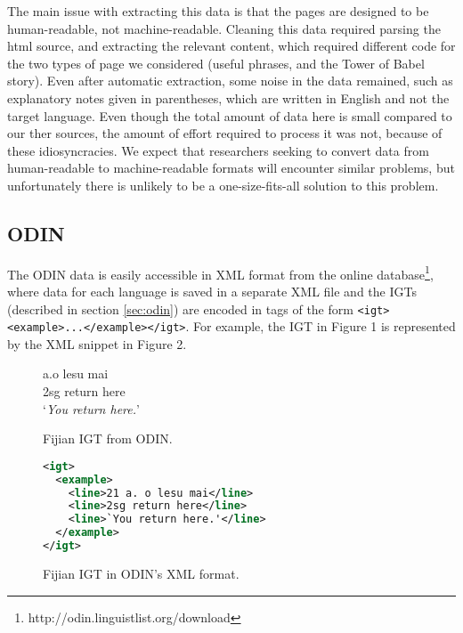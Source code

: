The main issue with extracting this data is that the pages are designed to be human-readable, not machine-readable.  Cleaning this data required parsing the html source, and extracting the relevant content, which required different code for the two types of page we considered (useful phrases, and the Tower of Babel story).  Even after automatic extraction, some noise in the data remained, such as explanatory notes given in parentheses, which are written in English and not the target language.  Even though the total amount of data here is small compared to our ther sources, the amount of effort required to process it was not, because of these idiosyncracies.  We expect that researchers seeking to convert data from human-readable to machine-readable formats will encounter similar problems, but unfortunately there is unlikely to be a one-size-fits-all solution to this problem.


\subsection{ODIN}

The ODIN data is easily accessible in XML format from the online database\footnote{http://odin.linguistlist.org/download}, where data for each language is saved in a separate XML file and the IGTs (described in section \ref{sec:odin}) are encoded in tags of the form \texttt{<igt><example>...</example></igt>}.  For example, the IGT in Figure 1 is represented by the XML snippet in Figure 2.

\begin{figure}
 a.\quad o lesu mai \\
\indent \qquad\qquad 2sg return here \\
\indent \qquad\qquad `\emph{You return here.}' \\
\caption{Fijian IGT from ODIN.} \label{fig:odin_fijian}
\end{figure}




\begin{figure}
\begin{lstlisting}[language=XML]
<igt>
  <example>
    <line>21 a. o lesu mai</line>
    <line>2sg return here</line>
    <line>`You return here.'</line>
  </example>
</igt>
\end{lstlisting} 
\caption{Fijian IGT in ODIN's XML format.} \label{fig:odin_fijian_xml}
\end{figure}

